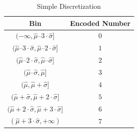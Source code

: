 \documentclass[twoside,11pt]{article}
\begin{document}
\begin{table}[h!]
  \begin{center}
    \begin{tabular}{|c|c|}
      \hline
      \textbf{Bin} & \textbf{Encoded Number}\\
      \hline
        $(-\infty ,\hat{\mu} – 3\cdot\hat{\sigma}]$ & $0$\\
        \hline
        $(\hat{\mu} – 3\cdot\hat{\sigma}, \hat{\mu} – 2\cdot\hat{\sigma}]$ & $1$\\
        \hline
        $(\hat{\mu} – 2\cdot\hat{\sigma}, \hat{\mu} – \hat{\sigma}]$ & $2$\\
        \hline
        $(\hat{\mu} – \hat{\sigma}, \hat{\mu}]$ & $3$\\
        \hline
        $(\hat{\mu}, \hat{\mu} + \hat{\sigma}]$ & $4$\\
        \hline
        $(\hat{\mu} + \hat{\sigma}, \hat{\mu} + 2\cdot\hat{\sigma}]$ & $5$\\
        \hline
        $(\hat{\mu} + 2\cdot\hat{\sigma}, \hat{\mu} + 3\cdot\hat{\sigma}]$ & $6$\\
        \hline
        $(\hat{\mu} + 3\cdot\hat{\sigma}, +\infty)$ & $7$\\
      \hline
    \end{tabular}
  \end{center}
  \caption{Simple Discretization}
  \label{auto_discrete}
\end{table}
\end{document}
